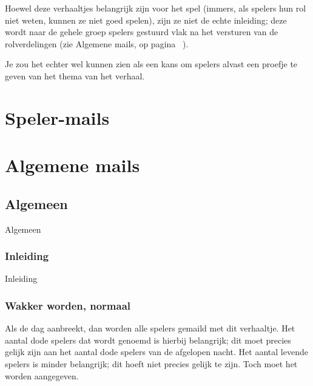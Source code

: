 \documentclass[12pt]{article}
\begin{document}
    Hoewel deze verhaaltjes belangrijk zijn voor het spel (immers, als spelers hun rol niet weten, kunnen ze niet goed spelen), zijn ze niet de echte inleiding; deze wordt naar de gehele groep spelers gestuurd vlak na het versturen van de rolverdelingen (zie Algemene mails, op pagina~\pageref{sec:Algemene} ).
    
    Je zou het echter wel kunnen zien als een kans om spelers alvast een proefje te geven van het thema van het verhaal.
    
\section{Speler-mails}

\section{Algemene mails}\label{sec:Algemene}

  \subsection{Algemeen}
  
    Algemeen
  
    \subsubsection{Inleiding}
    
      Inleiding
    
    \subsubsection{Wakker worden, normaal}
    
      Als de dag aanbreekt, dan worden alle spelers gemaild met dit verhaaltje. Het aantal dode spelers dat wordt genoemd is hierbij belangrijk; dit moet precies gelijk zijn aan het aantal dode spelers van de afgelopen nacht. Het aantal levende spelers is minder belangrijk; dit hoeft niet precies gelijk te zijn. Toch moet het worden aangegeven.
    
      \begin{center}
      \end{center}
    
\end{document}
